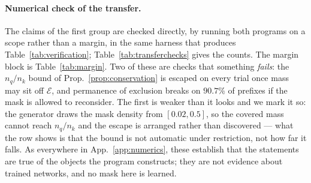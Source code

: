\documentclass{article}
\begin{document}
\paragraph{Numerical check of the transfer.} The claims of the first group are checked directly,
by running both programs on a scope rather than a margin, in the same harness that produces
Table~\ref{tab:verification}; Table~\ref{tab:transferchecks} gives the counts. The margin block is
Table~\ref{tab:margin}. Two of these are checks that something \emph{fails}: the
$n_q/n_k$ bound of Prop.~\ref{prop:conservation} is escaped on every trial once mass may sit off
$\mathcal{E}$, and permanence of exclusion breaks on $90.7\%$ of prefixes if the mask is allowed
to reconsider. The first is weaker than it looks and we mark it so: the generator draws the mask
density from $[0.02,0.5]$, so the covered mass cannot reach $n_q/n_k$ and the escape is arranged
rather than discovered --- what the row shows is that the bound is not automatic under
restriction, not how far it falls. As everywhere in App.~\ref{app:numerics}, these establish that
the statements are true of the objects the program constructs; they are not evidence about
trained networks, and no mask here is learned.
\end{document}
